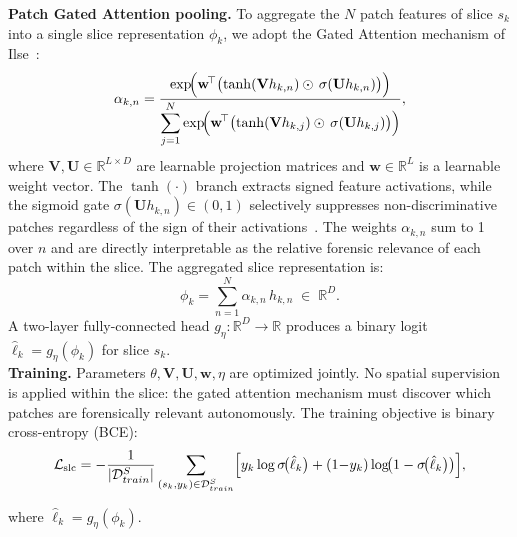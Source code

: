 \documentclass[sigconf, screen, review, anonymous]{acmart}
\begin{document}
%
\smallskip
\noindent\textbf{Patch Gated Attention pooling.}
To aggregate the $N$ patch features of slice $s_k$ into a single slice representation $\phi_k$, we adopt the Gated Attention mechanism of Ilse~\cite{ilse2018attention}: 
%
\begin{equation}
    \alpha_{k,n} = \frac{
        \exp\!\Bigl(\mathbf{w}^{\!\top}
            \bigl(\tanh(\mathbf{V} h_{k,n})
            \odot\, \sigma(\mathbf{U} h_{k,n})\bigr)\Bigr)
    }{
        \displaystyle\sum_{j=1}^{N}
        \exp\!\Bigl(\mathbf{w}^{\!\top}
            \bigl(\tanh(\mathbf{V} h_{k,j})
            \odot\, \sigma(\mathbf{U} h_{k,j})\bigr)\Bigr)
    },
    \label{eq:alpha}
\end{equation}
%
where $\mathbf{V}, \mathbf{U} \in \mathbb{R}^{L \times D}$ are learnable projection matrices and $\mathbf{w} \in \mathbb{R}^{L}$ is a learnable weight vector. The $\tanh(\cdot)$ branch extracts signed feature activations, while the sigmoid gate $\sigma(\mathbf{U} h_{k,n}) \in (0,1)$ selectively suppresses non-discriminative patches regardless of the sign of their activations~\cite{ilse2018attention}. The weights $\alpha_{k,n}$ sum to 1 over $n$ and are directly interpretable as the relative forensic relevance of each patch within the slice. The aggregated slice representation is:
%
\begin{equation}
    \phi_k = \sum_{n=1}^{N} \alpha_{k,n}\, h_{k,n} \;\in\; \mathbb{R}^{D}.
    \label{eq:slice_rep}
\end{equation}
%
A two-layer fully-connected head $g_\eta \colon \mathbb{R}^{D} \to \mathbb{R}$ produces a binary logit $\hat{\ell}_k = g_\eta(\phi_k)$ for slice $s_k$.\\
%
\smallskip
\noindent\textbf{Training.}
Parameters $\theta, \mathbf{V}, \mathbf{U}, \mathbf{w}, \eta$ are optimized jointly. No spatial supervision is applied within the slice: the gated attention mechanism must discover which patches are forensically relevant autonomously. The training objective is binary cross-entropy (BCE):
%
\begin{equation}
    \mathcal{L}_{\mathrm{slc}} = -\frac{1}{|\mathcal{D}^S_{train}|}
    \sum_{(s_k, y_k) \in \mathcal{D}^S_{train}}
    \Bigl[
        y_k \log \sigma\!\bigl(\hat{\ell}_k\bigr)
        + (1{-}y_k)\log\!\bigl(1 - \sigma\!\bigl(\hat{\ell}_k\bigr)\bigr)
    \Bigr],
    \label{eq:loss_cls}
\end{equation}

where $\hat{\ell}_k = g_\eta(\phi_k)$.

\end{document}
